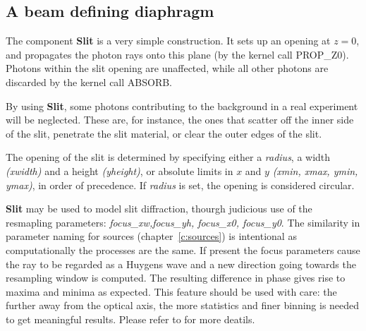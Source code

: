 \subsection*{A beam defining diaphragm}
\label{s:slit}

The component \textbf{Slit} is a very simple construction.
It sets up an opening at $z=0$, and propagates the photon rays
onto this plane (by the kernel call PROP\_Z0).
Photons within the slit opening are unaffected,
while all other photons are discarded by the kernel call ABSORB.

By using \textbf{Slit}, some photons contributing to the background
in a real experiment will be neglected.
These are, for instance, the ones that scatter off the inner side
of the slit, penetrate the slit material, or clear the outer edges of the slit.

The opening of the slit is determined by specifying either a \textit{radius}, a
width \textit{(xwidth)} and a height \textit{(yheight)}, or absolute limits in $x$
and $y$ \textit{(xmin, xmax, ymin, ymax)}, in order of precedence.
If \textit{radius} is set, the opening is considered circular.

\textbf{Slit} may be used to model slit diffraction, thourgh judicious use of the resmapling
parameters: \textit{focus\_xw,focus\_yh, focus\_x0, focus\_y0}. The similarity in parameter
naming for sources (chapter~\ref{c:sources}) is intentional as computationally the processes are
the same. If present the focus parameters cause the ray to be regarded as a Huygens wave and a new direction
going towards the resampling window is computed. The resulting difference in phase gives rise to maxima and minima as expected.
This feature should be used with care: the further away from the optical
axis, the more statistics and finer binning is needed to get meaningful results. Please refer to \cite{knudsen2013mcxtrace} for more deatils.

